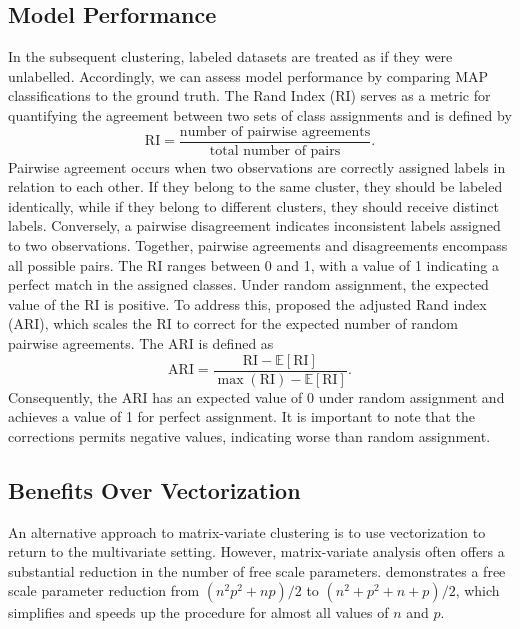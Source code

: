 \documentclass[12pt]{report}
\begin{document}
\subsection{Model Performance}
In the subsequent clustering, labeled datasets are treated as if they were unlabelled. Accordingly, we can assess model performance by comparing MAP classifications to the ground truth. The Rand Index (RI) \citep{rand1971} serves as a metric for quantifying the agreement between two sets of class assignments and is defined by
\begin{equation*}
\text{RI} = \frac{\text{number of pairwise agreements}}{\text{total number of pairs}}.
\end{equation*} 
Pairwise agreement occurs when two observations are correctly assigned labels in relation to each other. If they belong to the same cluster, they should be labeled identically, while if they belong to different clusters, they should receive distinct labels. Conversely, a pairwise disagreement indicates inconsistent labels assigned to two observations. Together, pairwise agreements and disagreements encompass all possible pairs. The RI ranges between 0 and 1, with a value of 1 indicating a perfect match in the assigned classes. Under random assignment, the expected value of the RI is positive. To address this, \citet{hubert1985} proposed the adjusted Rand index (ARI), which scales the RI to correct for the expected number of random pairwise agreements. The ARI is defined as 
\begin{equation*}
\text{ARI} = \frac{\text{RI}  - \mathbb{E}[\text{RI} ]}{\max(\text{RI}) - \mathbb{E}[\text{RI} ]}.
\end{equation*} 
Consequently, the ARI has an expected value of 0 under random assignment and achieves a value of 1 for perfect assignment. It is important to note that the corrections permits negative values, indicating worse than random assignment.




\subsection{Benefits Over Vectorization}
An alternative approach to matrix-variate clustering is to use vectorization to return to the multivariate setting. However, matrix-variate analysis often offers a substantial reduction in the number of free scale parameters. \citet{gallaugher2018} demonstrates a free scale parameter reduction from $(n^2p^2 + np)/2$ to $(n^2 + p^2 + n + p)/2$, which simplifies and speeds up the procedure for almost all values of $n$ and $p$. 
 
\end{document}
